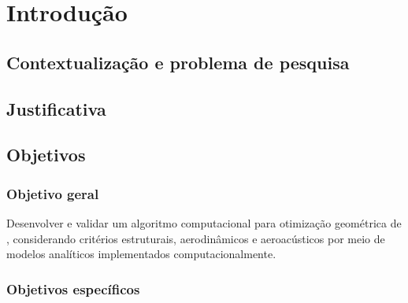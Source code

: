 \chapter{Introdução}
\label{chap:introducao}

\section{Contextualização e problema de pesquisa}
\label{sec:problema}


\section{Justificativa}
\label{sec:justificativa}


\section{Objetivos}
\label{sec:objetivos}

\subsection{Objetivo geral}

Desenvolver e validar um algoritmo computacional para otimização geométrica de \propellers, considerando critérios estruturais, aerodinâmicos e aeroacústicos por meio de modelos analíticos implementados computacionalmente.

\subsection{Objetivos específicos}


